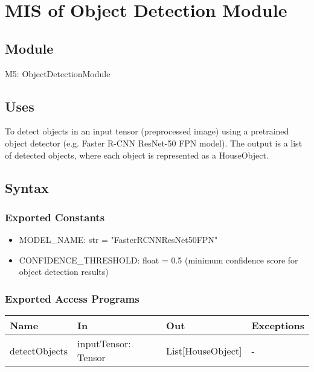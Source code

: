 \documentclass[12pt, titlepage]{article}
\begin{document}
\newpage

\section{MIS of Object Detection Module} \label{Module} 

\subsection{Module}

M5: ObjectDetectionModule

\subsection{Uses}
To detect objects in an input tensor (preprocessed image) using a pretrained object detector (e.g. Faster R-CNN ResNet-50 FPN model). The output is a list of detected objects, where each object is represented as a HouseObject.

\subsection{Syntax}

\subsubsection{Exported Constants}

\begin{itemize}
  \item MODEL{\_}NAME: str = "FasterRCNNResNet50FPN"
  \item CONFIDENCE{\_}THRESHOLD: float = 0.5 (minimum confidence score for object detection results)
\end{itemize}

\subsubsection{Exported Access Programs}

\begin{center}
\begin{tabular}{p{4cm} p{4cm} p{4cm} p{3.5cm}}
\hline
\textbf{Name} & \textbf{In} & \textbf{Out} & \textbf{Exceptions} \\
\hline
detectObjects & inputTensor: Tensor & List[HouseObject] & - \\
\hline
\end{tabular}
\end{center}
\end{document}
